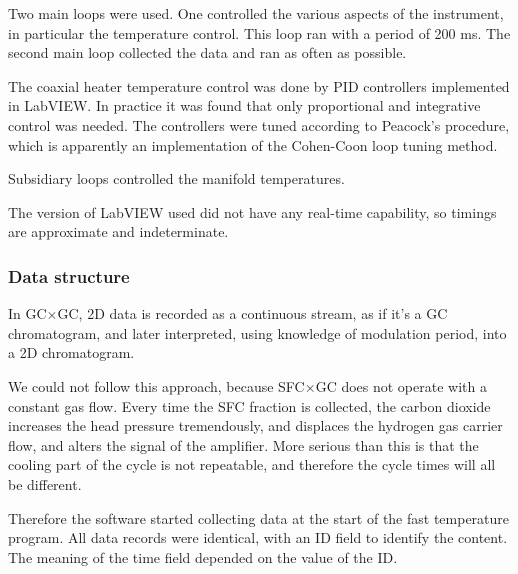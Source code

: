 \documentclass[aip,rsi,preprint,graphicx]{revtex4-1} %
\begin{document}
Two main loops were used. One controlled the various aspects of the instrument, in particular the temperature control. This loop ran with a  period of 200 ms. The second main loop collected the data and ran as often as possible.

The coaxial heater temperature control was done by PID controllers implemented in LabVIEW. In practice it was found that only proportional and integrative control was needed. The controllers were tuned according to Peacock's procedure\cite{Peacock2008}, which is apparently an implementation of the Cohen-Coon loop tuning method. 

Subsidiary loops controlled the manifold temperatures. 

The version of LabVIEW used did not have any real-time capability, so timings are approximate and indeterminate.

\subsubsection{Data structure}
In GC$\times$GC, 2D data is recorded as a continuous stream, as if it's a GC chromatogram, and later interpreted, using knowledge of modulation period, into a 2D chromatogram.

We could not follow this approach, because SFC$\times$GC does not operate with a constant gas flow. Every time the SFC fraction is collected, the carbon dioxide increases the head pressure tremendously, and displaces the hydrogen gas carrier flow, and alters the signal of the amplifier. More serious than this is that the cooling part of the cycle is not repeatable, and therefore the cycle times will all be different.

Therefore the software started collecting data at the start of the fast temperature program. All data records were identical, with an ID field to identify the content. The meaning of the time field depended on the value of the ID. 
\end{document}
